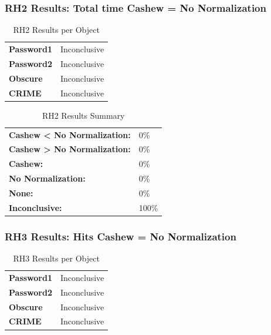 \documentclass{article}\usepackage[]{graphicx}\usepackage[]{color}
\begin{document}
	
	

	
	\subsubsection{RH2 Results: Total time Cashew = No Normalization}
	
	
	\begin{table}[H]
	\centering
	\caption{RH2 Results per Object}
	\begin{tabular}{ll}
	\textbf{Password1} & Inconclusive \\
	\textbf{Password2} & Inconclusive \\
	\textbf{Obscure} & Inconclusive \\
	\textbf{CRIME} & Inconclusive \\
	\end{tabular}
	\end{table}

	\begin{table}[H]
	\centering
	\caption{RH2 Results Summary}
	\begin{tabular}{ll}
	\textbf{Cashew \textless{} No Normalization:}& 0\% \\
	\textbf{Cashew \textgreater{} No Normalization:}& 0\%\\
	\textbf{Cashew:} & 0\%\\
	\textbf{No Normalization:} & 0\%\\
	\textbf{None:}& 0\%\\
	\textbf{Inconclusive:}& 100\%
			
	
	\end{tabular}
	\end{table}
	
	
	

	
	\subsubsection{RH3 Results: Hits Cashew = No Normalization}
	
	
	\begin{table}[H]
	\centering
	\caption{RH3 Results per Object}
	\begin{tabular}{ll}
	\textbf{Password1} & Inconclusive \\
	\textbf{Password2} & Inconclusive \\
	\textbf{Obscure} & Inconclusive \\
	\textbf{CRIME} & Inconclusive \\
	\end{tabular}
	\end{table}
\end{document}
